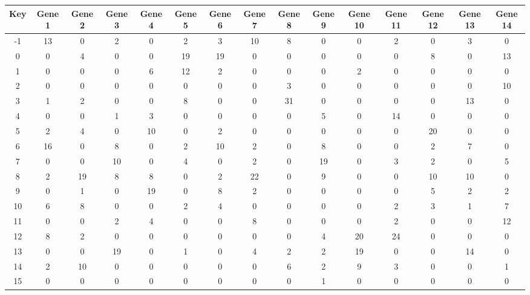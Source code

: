 \begin{tabular}{|c|c|c|c|c|c|c|c|c|c|c|c|c|c|c|}
\hline
Key & Gene 1 & Gene 2 & Gene 3 & Gene 4 & Gene 5 & Gene 6 & Gene 7 & Gene 8 & Gene 9 & Gene 10 & Gene 11 & Gene 12 & Gene 13 & Gene 14 \\
\hline
-1 & 13 & 0 & 2 & 0 & 2 & 3 & 10 & 8 & 0 & 0 & 2 & 0 & 3 & 0 \\
0 & 0 & 4 & 0 & 0 & 19 & 19 & 0 & 0 & 0 & 0 & 0 & 8 & 0 & 13 \\
1 & 0 & 0 & 0 & 6 & 12 & 2 & 0 & 0 & 0 & 2 & 0 & 0 & 0 & 0 \\
2 & 0 & 0 & 0 & 0 & 0 & 0 & 0 & 3 & 0 & 0 & 0 & 0 & 0 & 10 \\
3 & 1 & 2 & 0 & 0 & 8 & 0 & 0 & 31 & 0 & 0 & 0 & 0 & 13 & 0 \\
4 & 0 & 0 & 1 & 3 & 0 & 0 & 0 & 0 & 5 & 0 & 14 & 0 & 0 & 0 \\
5 & 2 & 4 & 0 & 10 & 0 & 2 & 0 & 0 & 0 & 0 & 0 & 20 & 0 & 0 \\
6 & 16 & 0 & 8 & 0 & 2 & 10 & 2 & 0 & 8 & 0 & 0 & 2 & 7 & 0 \\
7 & 0 & 0 & 10 & 0 & 4 & 0 & 2 & 0 & 19 & 0 & 3 & 2 & 0 & 5 \\
8 & 2 & 19 & 8 & 8 & 0 & 2 & 22 & 0 & 9 & 0 & 0 & 10 & 10 & 0 \\
9 & 0 & 1 & 0 & 19 & 0 & 8 & 2 & 0 & 0 & 0 & 0 & 5 & 2 & 2 \\
10 & 6 & 8 & 0 & 0 & 2 & 4 & 0 & 0 & 0 & 0 & 2 & 3 & 1 & 7 \\
11 & 0 & 0 & 2 & 4 & 0 & 0 & 8 & 0 & 0 & 0 & 2 & 0 & 0 & 12 \\
12 & 8 & 2 & 0 & 0 & 0 & 0 & 0 & 0 & 4 & 20 & 24 & 0 & 0 & 0 \\
13 & 0 & 0 & 19 & 0 & 1 & 0 & 4 & 2 & 2 & 19 & 0 & 0 & 14 & 0 \\
14 & 2 & 10 & 0 & 0 & 0 & 0 & 0 & 6 & 2 & 9 & 3 & 0 & 0 & 1 \\
15 & 0 & 0 & 0 & 0 & 0 & 0 & 0 & 0 & 1 & 0 & 0 & 0 & 0 & 0 \\
\hline
\end{tabular}